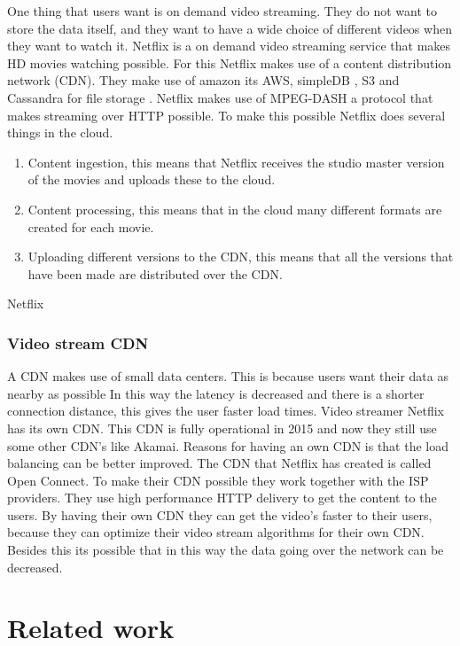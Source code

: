 \documentclass{sig-alternate-br}
\begin{document}
One thing that users want is on demand video streaming. They do not want to store the data itself, and they want to have a wide choice of different videos when they want to watch it. Netflix is a on demand video streaming service that makes HD movies watching possible. For this Netflix makes use of a content distribution network (CDN). They make use of amazon its AWS, simpleDB , S3 and Cassandra for file storage \cite{Adhikari:2012}. Netflix makes use of MPEG-DASH a protocol that makes streaming over HTTP possible. To make this possible Netflix does several things in the cloud. 

 \begin{enumerate}[topsep=0pt,itemsep=-1ex,partopsep=1ex,parsep=1ex]
 	\item Content ingestion, this means that Netflix receives the studio master version of the movies and uploads these to the cloud. 
 	\item Content processing, this means that in the cloud many different formats are created for each movie.
 	\item Uploading different versions to the CDN,	this means that all the versions that have been made are distributed over the CDN.
 \end{enumerate}
Netflix ~\cite{Adhikari:2012}




\subsubsection{Video stream CDN}
A CDN makes use of small data centers. This is because users want their data as nearby as possible  In this way the latency is decreased and there is a shorter connection distance, this gives the user faster load times. Video streamer Netflix has  its own CDN. This CDN is fully operational in 2015 and now they still use some other CDN's like Akamai. Reasons for having an own CDN is that the load balancing can be better improved. The CDN that Netflix has created is called Open Connect. To make their CDN possible they work together with the ISP providers. They use high performance HTTP delivery to get the content to the users. By having their own CDN they can get the video's faster to their users, because they can optimize their video stream algorithms for their own CDN. Besides this its possible that in this way the data going over the network can be decreased.


\section{Related work}
\end{document}
